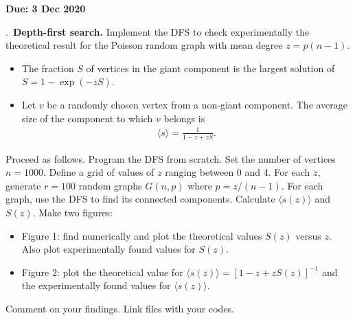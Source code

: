 \documentclass{letter}
\newcounter{problem}
\newcounter{solution}
\newcommand{\Problem}[2]{%
	\stepcounter{problem}%
	\leftskip=0pt%
	\theproblem.~\textbf{{#1.}} #2 \par%
}
\newcommand{\Due}[1]{\textbf{Due: #1} \par}
\begin{document}
    \Due{3 Dec 2020}

    \Problem{Depth-first search}{Implement the DFS to check experimentally the theoretical result for the Poisson random graph with mean degree $z = p(n-1)$. \begin{itemize}
        \item The fraction $S$ of vertices in the giant component is the largest solution of $S = 1 - \exp(-zS)$.
        \item Let $v$ be a randomly chosen vertex from a non-giant component. The average size of the component to which $v$ belongs is \begin{align*}
            \langle s \rangle = \frac{1}{1- z + zS}.
    \end{align*}
    \end{itemize} Proceed as follows. Program the DFS from scratch. Set the number of vertices $n = 1000$. Define a grid of values of $z$ ranging between 0 and 4. For each $z$, generate $r = 100$ random graphs $G(n,p)$ where $p = z/(n-1)$. For each graph, use the DFS to find its connected components. Calculate $\langle s(z) \rangle$ and $S(z)$. Make two figures: \begin{itemize}
        \item Figure 1: find numerically and plot the theoretical values $S(z)$ versus $z$. Also plot experimentally found values for $S(z)$.
        \item Figure 2: plot the theoretical value for $\langle s(z) \rangle = [1 - z + zS(z)]^{-1}$ and the experimentally found values for $\langle s(z) \rangle$.
    \end{itemize} Comment on your findings. Link files with your codes.}
\end{document}
